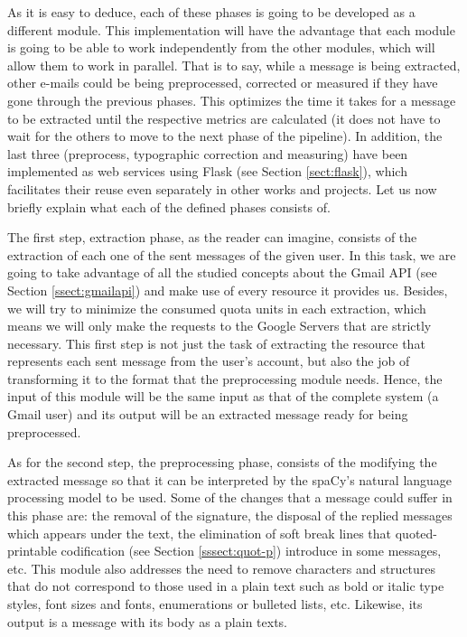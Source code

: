 As it is easy to deduce, each of these phases is going to be developed as a different module. This implementation will have the advantage that each module is going to be able to work independently from the other modules, which will allow them to work in parallel. That is to say, while a message is being extracted, other e-mails could be being preprocessed, corrected or measured if they have gone through the previous phases. This optimizes the time it takes for a message to be extracted until the respective metrics are calculated (it does not have to wait for the others to move to the next phase of the pipeline). In addition, the last three (preprocess, typographic correction and measuring) have been implemented as web services using Flask (see Section \ref{sect:flask}), which facilitates their reuse even separately in other works and projects. Let us now briefly explain what each of the defined phases consists of.

The first step, extraction phase, as the reader can imagine, consists of the extraction of each one of the sent messages of the given user. In this task, we are going to take advantage of all the studied concepts about the Gmail API (see Section \ref{ssect:gmailapi}) and make use of every resource it provides us. Besides, we will try to minimize the consumed quota units in each extraction, which means we will only make the requests to the Google Servers that are strictly necessary. This first step is not just the task of extracting the resource that represents each sent message from the user's account, but also the job of transforming it to the format that the preprocessing module needs. Hence, the input of this module will be the same input as that of the complete system (a Gmail user) and its output will be an extracted message ready for being preprocessed.

As for the second step, the preprocessing phase, consists of the modifying the extracted message so that it can be interpreted by the spaCy's natural language processing model to be used. Some of the changes that a message could suffer in this phase are: the removal of the signature, the disposal of the replied messages which appears under the text, the elimination of soft break lines that quoted-printable codification (see Section \ref{sssect:quot-p}) introduce in some messages, etc. This module also addresses the need to remove characters and structures that do not correspond to those used in a plain text such as bold or italic type styles, font sizes and fonts, enumerations or bulleted lists, etc. Likewise, its output is a message with its body as a plain texts.


